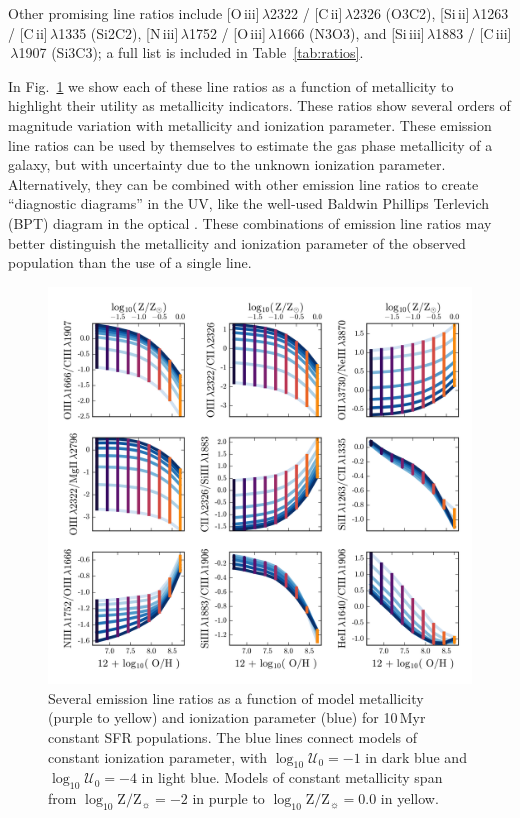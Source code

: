 \documentclass[preprint2,trackchanges]{aastex62}
\newcommand{\Myr}{$\,$Myr\xspace}
\newcommand{\logten}{\ensuremath{\log_{10}}}
\newcommand{\logZeq}[1]{\ensuremath{\logten \mathrm{Z}/\mathrm{Z}_{\sun} = #1}}
\newcommand{\logUeq}[1]{\ensuremath{\logten \mathcal{U}_0 = #1}}
\begin{document}
Other promising line ratios include [O{\sc \,iii}]$\,\lambda$2322 / [C{\sc \,ii}]$\,\lambda$2326 (O3C2), [Si{\sc \,ii}]$\,\lambda$1263 / [C{\sc \,ii}]$\,\lambda$1335 (Si2C2), [N{\sc \,iii}]$\,\lambda$1752 / [O{\sc \,iii}]$\,\lambda$1666 (N3O3), and [Si{\sc \,iii}]$\,\lambda$1883 / [C{\sc \,iii}]$\,\lambda$1907 (Si3C3); a full list is included in Table~\ref{tab:ratios}. 

In Fig.~\ref{fig:RatioVsLogZ} we show each of these line ratios as a function of metallicity to highlight their utility as metallicity indicators. These ratios show several orders of magnitude variation with metallicity and ionization parameter. These emission line ratios can be used by themselves to estimate the gas phase metallicity of a galaxy, but with uncertainty due to the unknown ionization parameter. Alternatively, they can be combined with other emission line ratios to create ``diagnostic diagrams'' in the UV, like the well-used Baldwin Phillips Terlevich (BPT) diagram in the optical \citep{BPT}. These combinations of emission line ratios may better distinguish the metallicity and ionization parameter of the observed population than the use of a single line.

\begin{figure}
  \begin{center}
    \includegraphics[width=\linewidth]{figs/f9.png}
    \caption{Several emission line ratios as a function of model metallicity (purple to yellow) and ionization parameter (blue) for 10\Myr constant SFR populations. The blue lines connect models of constant ionization parameter, with \logUeq{-1} in dark blue and \logUeq{-4} in light blue. Models of constant metallicity span from \logZeq{-2} in purple to \logZeq{0.0} in yellow.}
    \label{fig:RatioVsLogZ}
  \end{center}
\end{figure}
\end{document}
